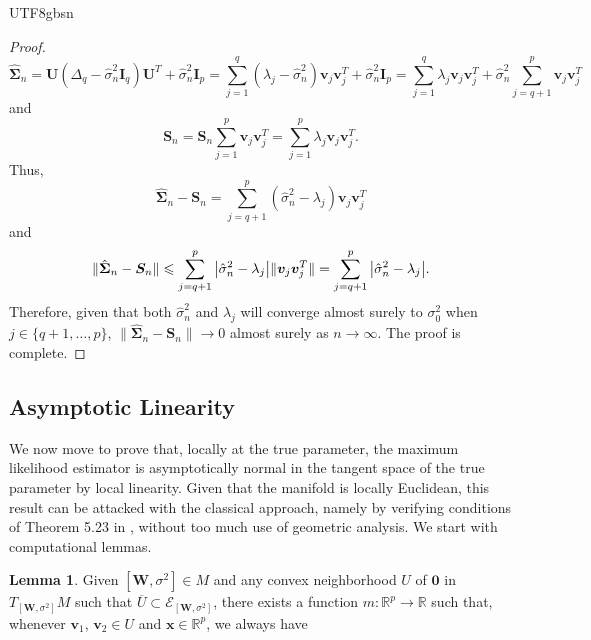 \documentclass[12pt]{report}
\newcommand{\bracket}[1]{\left ( #1 \right )}
\theoremstyle{plain}
\theoremstyle{definition}
\newtheorem{lemma}[theorem]{Lemma}
\begin{document}
\begin{CJK*}{UTF8}{gbsn}
\begin{proof}
\begin{equation*}
\hat{\bm{\Sigma}}_n =   \bm{U} \bracket{\Delta_q - \hat{\sigma}_n^2\bm{I}_q}\bm{U}^T + \hat{\sigma}_n^2 \bm{I}_p
= \sum_{j=1}^q (\lambda_j-\hat{\sigma}_n^2)\bm{v}_j\bm{v}_j^T + \hat{\sigma}_n^2 \bm{I}_p
= \sum_{j=1}^q \lambda_j\bm{v}_j\bm{v}_j^T + \hat{\sigma}_n^2 \sum_{j=q+1}^p \bm{v}_j\bm{v}_j^T
\end{equation*}
and 
\begin{equation*}
\bm{S}_n = \bm{S}_n \sum_{j=1}^p \bm{v}_j\bm{v}_j^T = \sum_{j=1}^p \lambda_j\bm{v}_j\bm{v}_j^T.
\end{equation*}
Thus, 
\begin{equation*}
\hat{\bm{\Sigma}}_n-\bm{S}_n = \sum_{j=q+1}^p \bracket{\hat{\sigma}_n^2-\lambda_j} \bm{v}_j\bm{v}_j^T
\end{equation*}
and 
\begin{equation*}
	\|\hat{\bm{\Sigma}}_n-\bm{S}_n	\| \leqslant \sum_{j=q+1}^p \abs{\hat{\sigma}_n^2-\lambda_j} \|\bm{v}_j\bm{v}_j^T\| = 
  \sum_{j=q+1}^p \abs{\hat{\sigma}_n^2-\lambda_j}.
\end{equation*}
Therefore, given that both $\hat{\sigma}_n^2$ and $\lambda_j$ 
will converge almost surely to $\sigma_0^2$ when $j \in \{q+1,\ldots,p\}$,
 $\|\hat{\bm{\Sigma}}_n-\bm{S}_n	\| \to 0 $ almost surely as $n \to \infty$.
The proof is complete.
\end{proof}

\subsection{Asymptotic Linearity}

We now move to prove that,
locally at the true parameter, 
the maximum likelihood estimator 
is asymptotically normal in the tangent space 
of the true parameter by local linearity.
Given that the manifold is locally Euclidean,
this result can be attacked 
with 
the classical approach,
namely by verifying conditions of 
Theorem 5.23 in \cite{van_der_Vaart_1998},
without too much 
use of geometric analysis.
We start with computational lemmas.

\begin{lemma}
Given $[\bm{W}, \sigma^2] \in M$
and any
convex neighborhood $U$ of $\bm{0}$
in $T_{[\bm{W}, \sigma^2]}M$ 
such that $\overline{U} \subset \mathcal{E}_{[\bm{W}, \sigma^2]}$,
there exists a function $m: \mathbb{R}^p \to \mathbb{R}$
such that, whenever 
$\bm{v}_1$, $\bm{v}_2 \in U$
and $\bm{x} \in \mathbb{R}^p$, we always have 


\end{lemma}
\end{CJK*}
\end{document}
